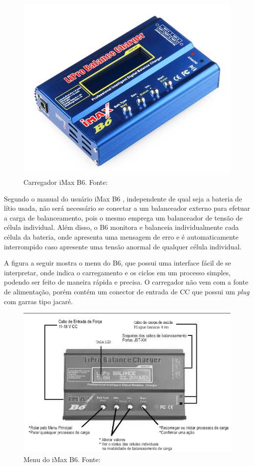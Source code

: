  \begin{figure}[h!]
    \centering
	\includegraphics[keepaspectratio=true,scale=0.4]{figuras/carregador1.jpg}
    \caption{Carregador iMax B6. Fonte: \cite{carregador1}}
    \label{fig:carregador1}
\end{figure}


Segundo o manual do usuário iMax B6 \cite{ibmax}, independente de qual seja a bateria de lítio usada, não será necessário se conectar a um balanceador externo para efetuar a carga de balanceamento, pois o mesmo emprega um balanceador de tensão de célula individual. Além disso, o B6 monitora e balanceia individualmente cada célula da bateria, onde apresenta uma mensagem de erro e é automaticamente interrompido caso apresente uma tensão anormal de qualquer célula individual. 

A figura a seguir mostra o menu do B6, que possui uma interface fácil de se interpretar, onde indica o carregamento e os ciclos em um processo simples, podendo ser feito de maneira rápida e precisa. O carregador não vem com a fonte de alimentação, porém contém um conector de entrada de CC que possui um \textit{plug} com garras tipo jacaré.

 \begin{figure}[h!]
    \centering
	\includegraphics[keepaspectratio=true,scale=0.5]{figuras/manual.png}
    \caption{Menu do iMax B6. Fonte: \cite{ibmax}}
\end{figure}


